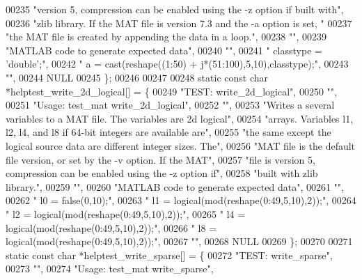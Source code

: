 \begin{DoxyCode}
00235     \textcolor{stringliteral}{"version 5, compression can be enabled using the -z option if built with"},
00236     \textcolor{stringliteral}{"zlib library. If the MAT file is version 7.3 and the -a  option is set, "}
00237     \textcolor{stringliteral}{"the MAT file is created by appending the data in a loop."},
00238     \textcolor{stringliteral}{""},
00239     \textcolor{stringliteral}{"MATLAB code to generate expected data"},
00240     \textcolor{stringliteral}{""},
00241     \textcolor{stringliteral}{"    classtype = 'double';"},
00242     \textcolor{stringliteral}{"    a = cast(reshape((1:50) + j*(51:100),5,10),classtype);"},
00243     \textcolor{stringliteral}{""},
00244     NULL
00245 \};
00246 
00247 
00248 \textcolor{keyword}{static} \textcolor{keyword}{const} \textcolor{keywordtype}{char} *helptest\_write\_2d\_logical[] = \{
00249     \textcolor{stringliteral}{"TEST: write\_2d\_logical"},
00250     \textcolor{stringliteral}{""},
00251     \textcolor{stringliteral}{"Usage: test\_mat write\_2d\_logical"},
00252     \textcolor{stringliteral}{""},
00253     \textcolor{stringliteral}{"Writes a several variables to a MAT file. The variables are 2d logical"},
00254     \textcolor{stringliteral}{"arrays. Variables l1, l2, l4, and l8 if 64-bit integers are available are"},
00255     \textcolor{stringliteral}{"the same except the logical source data are different integer sizes. The"},
00256     \textcolor{stringliteral}{"MAT file is the default file version, or set by the -v option. If the MAT"},
00257     \textcolor{stringliteral}{"file is version 5, compression can be enabled using the -z option if"},
00258     \textcolor{stringliteral}{"built with zlib library."},
00259     \textcolor{stringliteral}{""},
00260     \textcolor{stringliteral}{"MATLAB code to generate expected data"},
00261     \textcolor{stringliteral}{""},
00262     \textcolor{stringliteral}{"    l0 = false(0,10);"},
00263     \textcolor{stringliteral}{"    l1 = logical(mod(reshape(0:49,5,10),2));"},
00264     \textcolor{stringliteral}{"    l2 = logical(mod(reshape(0:49,5,10),2));"},
00265     \textcolor{stringliteral}{"    l4 = logical(mod(reshape(0:49,5,10),2));"},
00266     \textcolor{stringliteral}{"    l8 = logical(mod(reshape(0:49,5,10),2));"},
00267     \textcolor{stringliteral}{""},
00268     NULL
00269 \};
00270 
00271 \textcolor{keyword}{static} \textcolor{keyword}{const} \textcolor{keywordtype}{char} *helptest\_write\_sparse[] = \{
00272     \textcolor{stringliteral}{"TEST: write\_sparse"},
00273     \textcolor{stringliteral}{""},
00274     \textcolor{stringliteral}{"Usage: test\_mat write\_sparse"},

\end{DoxyCode}
